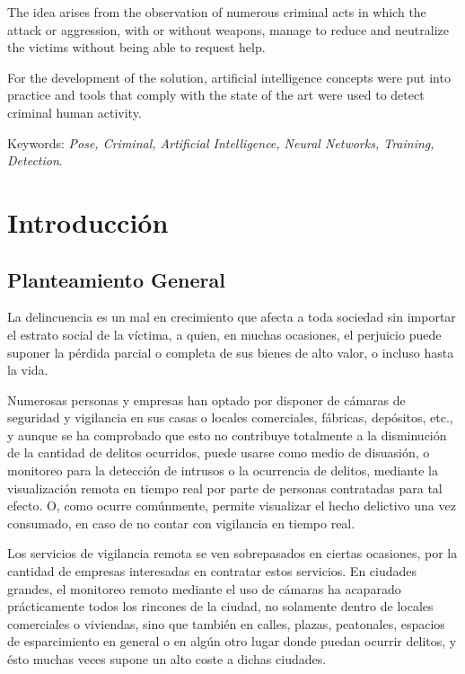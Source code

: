 \documentclass[a4paper,12pt,oneside,spanish]{book}
\begin{document}
The idea arises from the observation of numerous criminal acts in which the attack or aggression, with or without weapons, manage to reduce and neutralize the victims without being able to request help.\par

For the development of the solution, artificial intelligence concepts were put into practice and tools that comply with the state of the art were used to detect criminal human activity.\par

Keywords: \textit {Pose, Criminal, Artificial Intelligence, Neural Networks, Training, Detection}.

\newpage
\setlength{\parskip}{0.8em}
\chapter{Introducción} 
\section{Planteamiento General}
La delincuencia es un mal en crecimiento que afecta a toda sociedad sin importar el estrato social de la víctima, a quien, en muchas ocasiones, el perjuicio puede suponer la pérdida parcial o completa de sus bienes de alto valor, o incluso hasta la vida.\par 
 
Numerosas personas y empresas han optado por disponer de cámaras de seguridad y vigilancia en sus casas o locales comerciales, fábricas, depósitos, etc., y aunque se ha comprobado que esto no contribuye totalmente a la disminución de la cantidad de delitos ocurridos, puede usarse como medio de disuasión, o monitoreo para la detección de intrusos o la ocurrencia de delitos, mediante la visualización remota en tiempo real por parte de personas contratadas para tal efecto. O, como ocurre comúnmente, permite visualizar el hecho delictivo una vez consumado, en caso de no contar con vigilancia en tiempo real.\par 

Los servicios de vigilancia remota se ven sobrepasados en ciertas ocasiones, por la cantidad de empresas interesadas en contratar estos servicios. En ciudades grandes, el monitoreo remoto mediante el uso de cámaras ha acaparado prácticamente todos los rincones de la ciudad, no solamente dentro de locales comerciales o viviendas, sino que también en calles, plazas, peatonales, espacios de esparcimiento en general o en algún otro lugar donde puedan ocurrir delitos, y ésto muchas veces supone un alto coste a dichas ciudades.\par 
\end{document}

